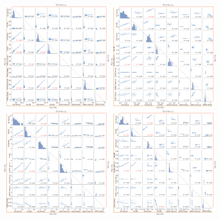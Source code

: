 \begin{figure}[htbp]
	\centering
	\includegraphics[width=0.49\textwidth]{./img/invariants/data/SUSSEX/prep2/images/2phases/output_pairplot_reset_triangle.png}
	\includegraphics[width=0.49\textwidth]{./img/invariants/data/SUSSEX/SO_driven/images/output_pairplot_reset_triangle.png}
    \\
    \vspace{10pt}
	\includegraphics[width=0.49\textwidth]{./img/invariants/data/SUSSEX/MLN_driven/images/output_pairplot_reset_triangle.png}
	\includegraphics[width=0.49\textwidth]{./img/invariants/data/SUSSEX/CV1a_driven1/images/2phases/output_pairplot_reset_triangle.png}

\end{figure}
